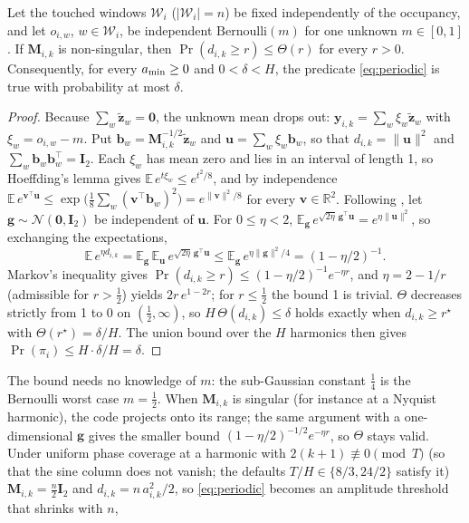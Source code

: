 \begin{proposition}\label{prop:chernoff}
Let the touched windows $\mathcal{W}_i$ ($|\mathcal{W}_i|=n$) be fixed independently of the occupancy, and let $o_{i,w}$, $w\in\mathcal{W}_i$, be independent $\mathrm{Bernoulli}(m)$ for one unknown $m\in[0,1]$. If $\mathbf{M}_{i,k}$ is non-singular, then $\Pr(d_{i,k}\ge r)\le \Theta(r)$ for every $r>0$. Consequently, for every $a_{\min}\ge0$ and $0<\delta<H$, the predicate \eqref{eq:periodic} is true with probability at most $\delta$.
\end{proposition}
\begin{proof}
Because $\sum_w\tilde{\mathbf{z}}_w=\mathbf{0}$, the unknown mean drops out: $\mathbf{y}_{i,k}=\sum_w\xi_w\tilde{\mathbf{z}}_w$ with $\xi_w=o_{i,w}-m$. Put $\mathbf{b}_w=\mathbf{M}_{i,k}^{-1/2}\tilde{\mathbf{z}}_w$ and $\mathbf{u}=\sum_w\xi_w\mathbf{b}_w$, so that $d_{i,k}=\|\mathbf{u}\|^2$ and $\sum_w\mathbf{b}_w\mathbf{b}_w^{\top}=\mathbf{I}_2$. Each $\xi_w$ has mean zero and lies in an interval of length 1, so Hoeffding's lemma \citep{hoeffding1963} gives $\mathbb{E}\,e^{t\xi_w}\le e^{t^2/8}$, and by independence $\mathbb{E}\,e^{\mathbf{v}^{\top}\mathbf{u}}\le\exp\big(\tfrac18\sum_w(\mathbf{v}^{\top}\mathbf{b}_w)^2\big)=e^{\|\mathbf{v}\|^2/8}$ for every $\mathbf{v}\in\mathbb{R}^2$. Following \citet{hsu2012tail}, let $\mathbf{g}\sim\mathcal{N}(\mathbf{0},\mathbf{I}_2)$ be independent of $\mathbf{u}$. For $0\le\eta<2$, $\mathbb{E}_{\mathbf{g}}\,e^{\sqrt{2\eta}\,\mathbf{g}^{\top}\mathbf{u}}=e^{\eta\|\mathbf{u}\|^2}$, so exchanging the expectations,
\[
  \mathbb{E}\,e^{\eta d_{i,k}}=\mathbb{E}_{\mathbf{g}}\,\mathbb{E}_{\mathbf{u}}\,e^{\sqrt{2\eta}\,\mathbf{g}^{\top}\mathbf{u}}\le\mathbb{E}_{\mathbf{g}}\,e^{\eta\|\mathbf{g}\|^2/4}=(1-\eta/2)^{-1}.
\]
Markov's inequality gives $\Pr(d_{i,k}\ge r)\le(1-\eta/2)^{-1}e^{-\eta r}$, and $\eta=2-1/r$ (admissible for $r>\tfrac12$) yields $2r\,e^{1-2r}$; for $r\le\tfrac12$ the bound 1 is trivial. $\Theta$ decreases strictly from 1 to 0 on $(\tfrac12,\infty)$, so $H\,\Theta(d_{i,k})\le\delta$ holds exactly when $d_{i,k}\ge r^\star$ with $\Theta(r^\star)=\delta/H$. The union bound over the $H$ harmonics then gives $\Pr(\pi_i)\le H\cdot\delta/H=\delta$.
\end{proof}
The bound needs no knowledge of $m$: the sub-Gaussian constant $\tfrac14$ is the Bernoulli worst case $m=\tfrac12$. When $\mathbf{M}_{i,k}$ is singular (for instance at a Nyquist harmonic), the code projects onto its range; the same argument with a one-dimensional $\mathbf{g}$ gives the smaller bound $(1-\eta/2)^{-1/2}e^{-\eta r}$, so $\Theta$ stays valid. Under uniform phase coverage at a harmonic with $2(k{+}1)\not\equiv0\pmod T$ (so that the sine column does not vanish; the defaults $T/H\in\{8/3,24/2\}$ satisfy it) $\mathbf{M}_{i,k}=\tfrac{n}{2}\mathbf{I}_2$ and $d_{i,k}=n\,a_{i,k}^2/2$, so \eqref{eq:periodic} becomes an amplitude threshold that shrinks with $n$,

